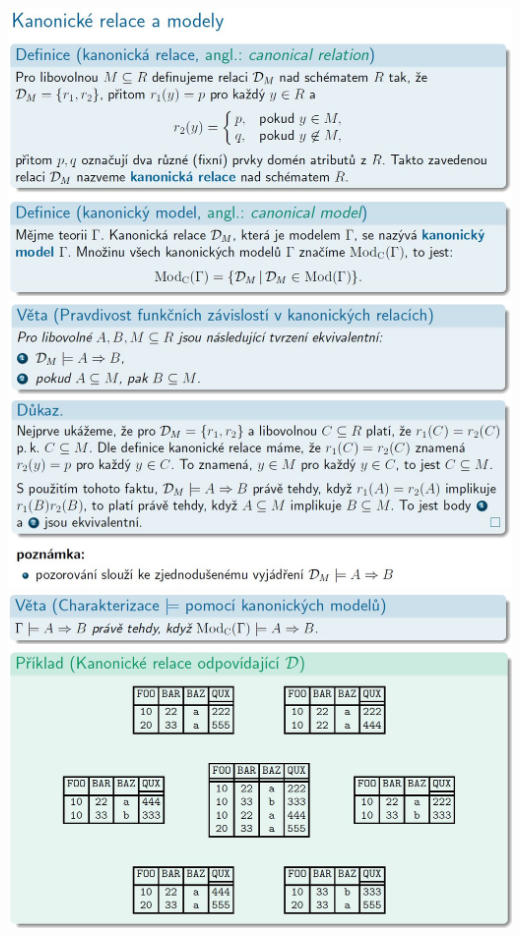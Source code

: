 \documentclass[10pt,a4paper]{article}
\begin{document}
\includegraphics[scale=0.37]{img/5-08.jpg}\\[2ex]
\includegraphics[scale=0.37]{img/5-09.jpg}\\[2ex]
\includegraphics[scale=0.37]{img/5-10.jpg}\\[2ex]
\includegraphics[scale=0.37]{img/5-11.jpg}\\[2ex]
\end{document}
